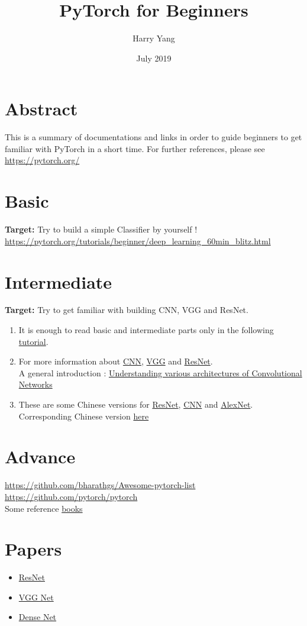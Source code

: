 \documentclass{article}
\title{PyTorch for Beginners}
\author{Harry Yang}
\date{July 2019}
\begin{document}
\maketitle

\section{Abstract}
This is a summary of documentations and links in order to guide beginners to get familiar with PyTorch in a short time. For further references, please see  \url{https://pytorch.org/} 
\section{Basic}
\textbf{Target: } Try to build a simple Classifier by yourself ! \\
\url{https://pytorch.org/tutorials/beginner/deep_learning_60min_blitz.html}
\section{Intermediate}
\textbf{Target: } Try to get familiar with building CNN, VGG and ResNet. \\
\begin{enumerate}
    \item It is enough to read basic and intermediate parts only in the following \href{https://github.com/yunjey/pytorch-tutorial/tree/master/tutorials}{tutorial}.
    \item For more information about \href{https://github.com/yunjey/pytorch-tutorial/tree/master/tutorials}{CNN}, \href{https://github.com/yunjey/pytorch-tutorial/tree/master/tutorials}{VGG} and \href{https://towardsdatascience.com/an-overview-of-resnet-and-its-variants-5281e2f56035}{ResNet}.\\
    A general introduction : \href{https://cv-tricks.com/cnn/understand-resnet-alexnet-vgg-inception/}{Understanding various architectures of Convolutional Networks}
    \item These are some Chinese versions for \href{https://zhuanlan.zhihu.com/p/31852747}{ResNet}, \href{https://blog.csdn.net/v_JULY_v/article/details/51812459}{CNN} and \href{https://blog.csdn.net/daydayup_668819/article/details/79744095}{AlexNet}.\\
    Corresponding Chinese version \href{https://zhuanlan.zhihu.com/p/32116277}{here}
\end{enumerate}

\section{Advance}
\url{https://github.com/bharathgs/Awesome-pytorch-list}\\
\url{https://github.com/pytorch/pytorch}\\
Some reference \href{https://srdas.github.io/DLBook/ConvNets.html}{books}

\section{Papers}
\begin{itemize}
    \item 
    \href{https://arxiv.org/pdf/1512.03385.pdf}{ResNet}
    \item
    \href{https://arxiv.org/pdf/1409.1556.pdf}{VGG Net}
    \item
    \href{https://arxiv.org/pdf/1608.06993.pdf}{Dense Net}
\end{itemize}
\end{document}
